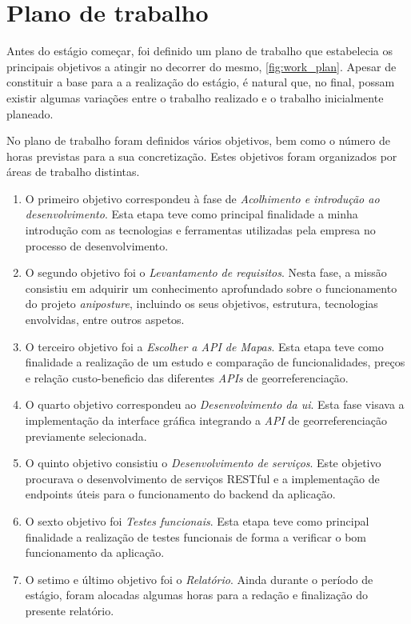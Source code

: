 \chapter{Plano de trabalho}%
\label{chapter:work-plan}

Antes do estágio começar, foi definido um plano de trabalho que estabelecia os principais objetivos a atingir no decorrer do mesmo, \autoref{fig:work_plan}. Apesar de constituir a base para a a realização do estágio, é natural que, no final, possam existir algumas variações entre o trabalho realizado e o trabalho inicialmente planeado.

No plano de trabalho foram definidos vários objetivos, bem como o número de horas previstas para a sua concretização. Estes objetivos foram organizados por áreas de trabalho distintas.

\begin{enumerate}
    \item O primeiro objetivo correspondeu à fase de \textit{Acolhimento e introdução ao desenvolvimento}. Esta etapa teve como principal finalidade a minha introdução com as tecnologias e ferramentas utilizadas pela empresa no processo de desenvolvimento.
    \item O segundo objetivo foi o \textit{Levantamento de requisitos}. Nesta fase, a missão consistiu em adquirir um conhecimento aprofundado sobre o funcionamento do projeto \textit{aniposture}, incluindo os seus objetivos, estrutura, tecnologias envolvidas, entre outros aspetos.
    \item O terceiro objetivo foi a \textit{Escolher a API de Mapas}. Esta etapa teve como finalidade a realização de um estudo e comparação de funcionalidades, preços e relação custo-beneficio das diferentes \textit{APIs} de georreferenciação. 
    \item O quarto objetivo correspondeu ao \textit{Desenvolvimento da \acs{ui}}. Esta fase visava a implementação da interface gráfica integrando a \textit{API} de georreferenciação previamente selecionada. 
    \item O quinto objetivo consistiu o \textit{Desenvolvimento de serviços}. Este objetivo procurava  o desenvolvimento de serviços RESTful e a implementação de endpoints úteis para  o funcionamento do backend da aplicação. 
    \item O sexto objetivo foi \textit{Testes funcionais}. Esta etapa teve como principal finalidade a realização de testes funcionais de forma a verificar o bom funcionamento da aplicação.
    \item O setimo e último objetivo foi o \textit{Relatório}. Ainda durante o período de estágio, foram alocadas algumas horas para a redação e finalização do presente relatório.
\end{enumerate}


